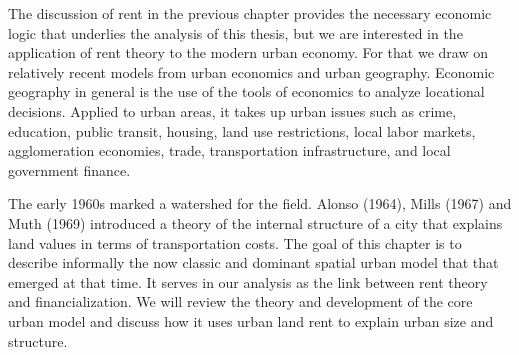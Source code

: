 




The discussion of rent in the previous chapter provides the necessary economic logic that underlies the analysis of this thesis, but we are interested in the application of rent theory to the modern urban economy. For that we draw on relatively recent models from urban economics and urban geography. Economic geography in general is the use of the tools of economics to analyze locational decisions. Applied to urban areas, it takes up urban issues such as crime, education, public transit, housing, land use restrictions, local labor markets, agglomeration economies, trade, transportation infrastructure, and local government finance. 

The early 1960s marked a watershed for the field.  Alonso (1964), Mills (1967) and Muth (1969) introduced a theory of the internal structure of a city that explains land values in terms of transportation costs. The goal of this chapter is to describe informally the now classic and dominant spatial urban model that that emerged at that time. It serves in our analysis as the link between rent theory and financialization. %
We will review the theory and development of the core urban model and discuss how it uses urban land rent to explain urban size and structure. %

